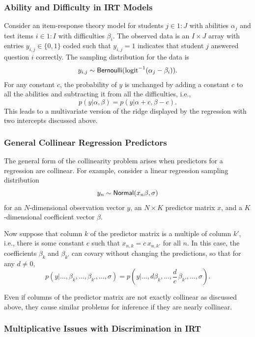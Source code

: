 \subsubsection{Ability and Difficulty in IRT Models}

Consider an item-response theory model for students $j \in 1{:}J$ with
abilities $\alpha_j$ and test items $i \in 1{:}I$ with difficulties
$\beta_i$.  The observed data is an $I \times J$ array with entries
$y_{i, j} \in \{ 0, 1 \}$ coded such that $y_{i, j} = 1$ indicates that
student $j$ answered question $i$ correctly.  The sampling
distribution for the data is
%
\[
y_{i, j} \sim \mbox{\sf Bernoulli}(\mbox{logit}^{-1}(\alpha_j - \beta_i)).
\]
%
For any constant $c$, the probability of $y$ is unchanged by adding a
constant $c$ to all the abilities and subtracting it from all the
difficulties, i.e.,
%
\[
p(y | \alpha, \beta)
=
p(y | \alpha + c, \beta - c).
\]
%
This leads to a multivariate version of the ridge displayed by the
regression with two intercepts discussed above.

\subsubsection{General Collinear Regression Predictors}

The general form of the collinearity problem arises when predictors
for a regression are collinear.  For example, consider a linear
regression sampling distribution
\[
y_n \sim \mbox{\sf Normal}(x_n \beta, \sigma)
\]
for an $N$-dimensional observation vector $y$, an $N \times K$ predictor
matrix $x$, and a $K$-dimensional coefficient vector $\beta$.

Now suppose that column $k$ of the predictor matrix is a multiple of
column $k'$, i.e., there is some constant $c$ such that $x_{n,k} = c
\, x_{n,k'}$ for all $n$.  In this case, the coefficients $\beta_k$
and $\beta_{k'}$ can covary without changing the predictions, so that
for any $d \neq 0$,
%
\[
p(y | \ldots, \beta_k, \ldots, \beta_{k'}, \ldots, \sigma)
=
p(y | \ldots, d  \beta_k, \ldots, \frac{d}{c} \, \beta_{k'}, \ldots,
\sigma).
\]

Even if columns of the predictor matrix are not exactly collinear as
discussed above, they cause similar problems for inference if they are
nearly collinear.


\subsubsection{Multiplicative Issues with Discrimination in IRT}

